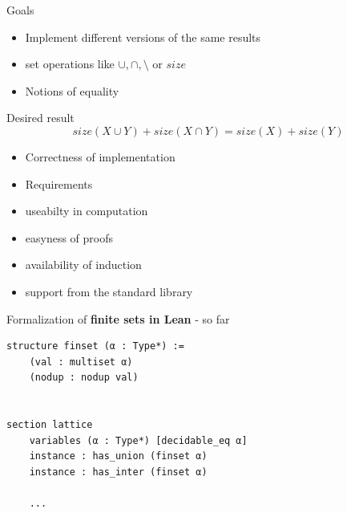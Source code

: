 \documentclass[aspectratio=169]{beamer}
\begin{document}
    \begin{frame}{Goals}
        \begin{itemize}
            \item Implement different versions of the same results
            \item set operations like $\cup, \cap, \setminus$ or $size$
            \item Notions of equality
        \end{itemize}
        Desired result \[size(X \cup Y) + size (X \cap Y) = size(X) + size(Y)\]
        \begin{itemize}
            \item Correctness of implementation
            \item Requirements
            \item useabilty in computation
            \item easyness of proofs
            \item availability of induction
            \item support from the standard library
        \end{itemize}
    
    \end{frame}

    \begin{frame}[fragile]{Formalization of \textbf{finite sets in Lean} - so far}
        \begin{lstlisting}
structure finset (α : Type*) :=
    (val : multiset α)
    (nodup : nodup val)


section lattice
    variables (α : Type*) [decidable_eq α] 
    instance : has_union (finset α) 
    instance : has_inter (finset α)

    ...
        \end{lstlisting}
    \end{frame}
\end{document}
